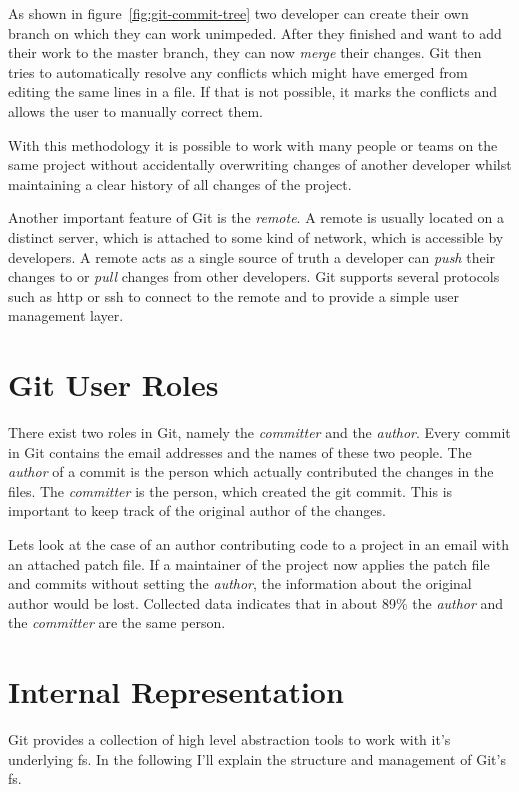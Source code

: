 As shown in figure~\ref{fig:git-commit-tree} two developer can create their own branch on which they can work unimpeded.
After they finished and want to add their work to the master branch, they can now \emph{merge} their changes.
Git then tries to automatically resolve any conflicts which might have emerged from editing the same lines in a file.
If that is not possible, it marks the conflicts and allows the user to manually correct them.


With this methodology it is possible to work with many people or teams on the same project without accidentally overwriting changes of another developer whilst maintaining a clear history of all changes of the project.

Another important feature of Git is the \emph{remote}.
A remote is usually located on a distinct server, which is attached to some kind of network, which is accessible by developers.
A remote acts as a single source of truth a developer can \emph{push} their changes to or \emph{pull} changes from other developers.
Git supports several protocols such as \ac{http} or \ac{ssh} to connect to the remote and to provide a simple user management layer.


\section{Git User Roles}
There exist two roles in Git, namely the \emph{committer} and the \emph{author}.
Every commit in Git contains the email addresses and the names of these two people.
The \emph{author} of a commit is the person which actually contributed the changes in the files.
The \emph{committer} is the person, which created the git commit.
This is important to keep track of the original author of the changes.

Lets look at the case of an author contributing code to a project in an email with an attached patch file.
If a maintainer of the project now applies the patch file and commits without setting the \emph{author}, the information about the original author would be lost.
Collected data indicates that in about 89\% the \emph{author} and the \emph{committer} are the same person.


\section{Internal Representation}
Git provides a collection of high level abstraction tools to work with it's underlying \ac{fs}.
In the following I'll explain the structure and management of Git's \ac{fs}.

